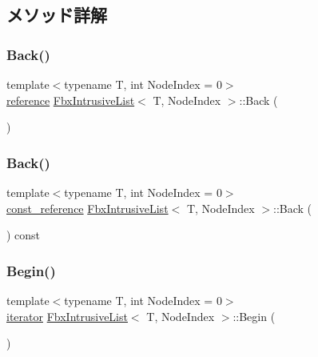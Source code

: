 \subsection{メソッド詳解}
\mbox{\label{class_fbx_intrusive_list_a665a77e92b2ff654b2571e1375e7ce25}} 
\subsubsection{\texorpdfstring{Back()}{Back()}\hspace{0.1cm}{\footnotesize\ttfamily [1/2]}}
{\footnotesize\ttfamily template$<$typename T, int Node\+Index = 0$>$ \\
\hyperlink{class_fbx_intrusive_list_aa927f048081371fe74dff673d3a5a8ad}{reference} \hyperlink{class_fbx_intrusive_list}{Fbx\+Intrusive\+List}$<$ T, Node\+Index $>$\+::Back (\begin{DoxyParamCaption}{ }\end{DoxyParamCaption})}

\mbox{\label{class_fbx_intrusive_list_a80f48fff8dee5d4a6391409a17292c91}} 
\subsubsection{\texorpdfstring{Back()}{Back()}\hspace{0.1cm}{\footnotesize\ttfamily [2/2]}}
{\footnotesize\ttfamily template$<$typename T, int Node\+Index = 0$>$ \\
\hyperlink{class_fbx_intrusive_list_a21904cb72c0ccae9d5c0b9f171befeb8}{const\+\_\+reference} \hyperlink{class_fbx_intrusive_list}{Fbx\+Intrusive\+List}$<$ T, Node\+Index $>$\+::Back (\begin{DoxyParamCaption}{ }\end{DoxyParamCaption}) const}

\mbox{\label{class_fbx_intrusive_list_aae6fe870895328f5ec5ec393833faa72}} 
\subsubsection{\texorpdfstring{Begin()}{Begin()}\hspace{0.1cm}{\footnotesize\ttfamily [1/2]}}
{\footnotesize\ttfamily template$<$typename T, int Node\+Index = 0$>$ \\
\hyperlink{class_fbx_intrusive_list_ae1012cd86e3ff0a4a49c982f0d34b4e7}{iterator} \hyperlink{class_fbx_intrusive_list}{Fbx\+Intrusive\+List}$<$ T, Node\+Index $>$\+::Begin (\begin{DoxyParamCaption}{ }\end{DoxyParamCaption})}

